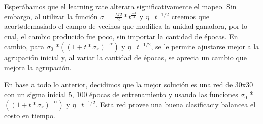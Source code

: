 Esper\'abamos que el learning rate alterara significativamente el mapeo. Sin embargo, al utilizar la funci\'on $\sigma$ = $\frac{M2}{2}*t^\frac{-1}{3}$ y $\eta$=$t^{-1/2}$  creemos que acort\o demasiado el campo de vecinos que modifica la unidad ganadora, por lo cual, el cambio producido fue poco, sin importar la cantidad de \'epocas.
En cambio, para $\sigma_0$ *$((1+t*\sigma_r)^{-\alpha})$ y $\eta$=$t^{-1/2}$, se le permite ajustarse mejor a la agrupaci\'on inicial y, al variar la cantidad de \'epocas, se aprecia un cambio que mejora la agrupaci\'on.

En base a todo lo anterior, decidimos que la mejor soluci\'on es una red de 30x30 con un sigma inicial 5, 100 \'epocas de entrenamiento y usando las funciones $\sigma_0$ *$((1+t*\sigma_r)^{-\alpha})$ y $\eta$=$t^{-1/2}$. Esta red provee una buena clasificaci\on y balancea el costo en tiempo.

